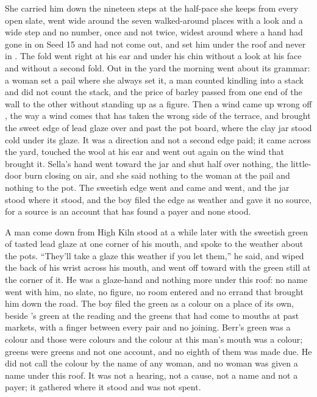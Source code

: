 She carried him down the nineteen steps at the half-pace she keeps from every open slate, went wide around the seven walked-around places with a look and a wide step and no number, once and not twice, widest around  where a hand had gone in on Seed 15 and had not come out, and set him under the roof and never in . The fold went right at his ear and under his chin without a look at his face and without a second fold. Out in the yard the morning went about its grammar: a woman set a pail where she always set it, a man counted kindling into a stack and did not count the stack, and the price of barley passed from one end of the wall to the other without standing up as a figure. Then a wind came up wrong off , the way a wind comes that has taken the wrong side of the terrace, and brought the sweet edge of lead glaze over  and past the pot board, where the clay jar stood cold under its glaze. It was a direction and not a second edge paid; it came across the yard, touched the wool at his ear and went out again on the wind that brought it. Sella's hand went toward the jar and shut half over nothing, the little-door burn closing on air, and she said nothing to the woman at the pail and nothing to the pot. The sweetish edge went and came and went, and the jar stood where it stood, and the boy filed the edge as weather and gave it no source, for a source is an account that has found a payer and none stood.

\scenebreak

A man come down  from High Kiln stood at  a while later with the sweetish green of tasted lead glaze at one corner of his mouth, and spoke to the weather about the pots. “They'll take a glaze this weather if you let them,” he said, and wiped the back of his wrist across his mouth, and went off toward  with the green still at the corner of it. He was a glaze-hand and nothing more under this roof: no name went with him, no slate, no figure, no room entered and no errand that brought him down the road. The boy filed the green as a colour on a place of its own, beside 's green at the reading and the greens that had come to mouths at past markets, with a finger between every pair and no joining. Berr's green was a colour and those were colours and the colour at this man's mouth was a colour; greens were greens and not one account, and no eighth of them was made due. He did not call the colour by the name of any woman, and no woman was given a name under this roof. It was not a hearing, not a cause, not a name and not a payer; it gathered where it stood and was not spent.

